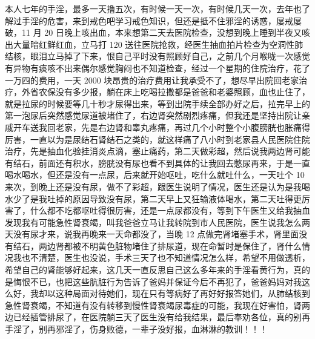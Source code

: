 \begin{case}
    本人七年的手淫，最多一天撸五次，有时候一天一次，有时候几天一次，去年也了解过手淫的危害，来到戒色吧学习戒色知识，但还是抵不住邪淫的诱惑，屡戒屡破，11 月 20 日晚上咳出血，本来想第二天去医院检查，没想到晚上睡到半夜又咳出大量暗红鲜红血，立马打 120 送往医院抢救，经医生抽血拍片检查为空洞性肺结核，眼泪立马掉了下来，恨自己平时没有照顾好自己，之前几个月喉咙一次感觉有异物有痰咳不出来偶尔感觉胸闷也不知道检查，经过一个星期的住院治疗，花了一万四的费用，一天 2000 块昂贵的治疗费用让我承受不了，想尽早出院回老家治疗，外省农保没有多少报，躺在床上吃喝拉撒都是爸爸和老婆照顾，血也止住了，就是拉尿的时候要等几十秒才尿得出来，等到出院手续全部办好之后，拉完早上的第一泡尿后突然感觉尿道被堵住了，右边肾突然剧烈疼痛，但我还是坚持出院让亲戚开车送我回老家，先是右边肾和睾丸疼痛，再过几个小时整个小腹膀胱也胀痛得厉害，一直以为是尿结石肾结石之类的，就这样痛了八小时到老家县人民医院住院治疗，先是抽血化验挂消炎点滴，塞止痛药，第二天做彩超，然后说我两边肾可能有结石，前面还有积水，膀胱没有尿也看不到具体的让我回去憋尿再来，于是一直喝水喝水，但还是没有一点尿，后来就开始呕吐，吃什么就吐什么，一天吐个 10 来次，到晚上还是没有尿，做不了彩超，跟医生说明了情况，医生还是认为是我喝水少了是我吐掉的原因导致没有尿，第二天早上又狂输液体喝水，第二天吐得更厉害了，什么都不吃都呕吐得很厉害，还是一点尿都没有，等到下午医生又给我抽血发现我有可能急性肾衰竭，叫我爸爸立马让我转院到市人民医院，医生说我怎么两天没有尿才来，说我再晚来一天命都没了，当晚 12 点做完肾堵塞手术，肾里面没有结石，两边肾都被不明黄色脏物堵住了排尿道，现在命暂时是保住了，肾什么情况我也不清楚，医生也没说，手术三天了也不知道情况怎么样，希望不用做透析，希望自己的肾能够好起来，这几天一直反思自己这么多年来的手淫看黄行为，真的是悔恨不已，也把这些肮脏行为告诉了爸妈并保证今后不再犯了，爸爸妈妈对我这么好，我却以这种局面对待她们，现在只有等病好了再好好报答她们，从肺结核到急性肾衰竭，不知道有没有转移到慢性肾衰竭尿毒症的可能，我现在好害怕，肾两边已经插管排尿了，在医院躺三天了医生没有给我结果，最后奉劝各位，真的别再手淫了，别再邪淫了，伤身败德，一辈子没好报，血淋淋的教训！！！


\end{case}
